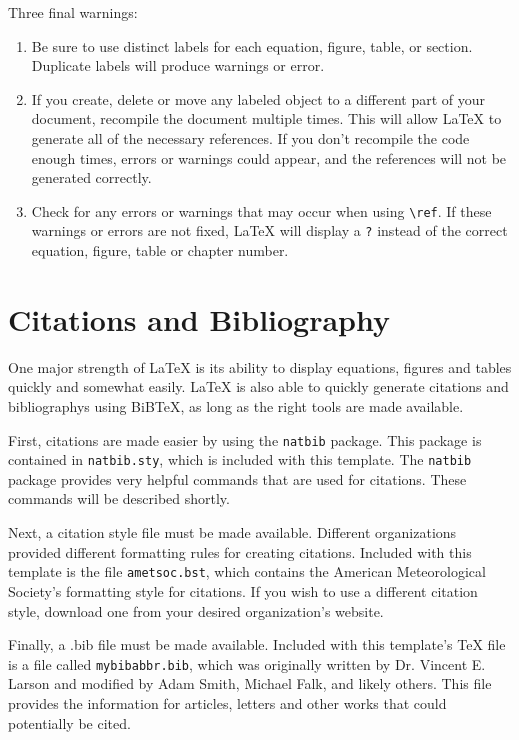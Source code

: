 \documentclass[master]{UWMThesis}
\begin{document}
Three final warnings:

\begin{enumerate}
\item Be sure to use distinct labels for each equation, figure, table, or section.  Duplicate labels will produce warnings or error.

\item If you create, delete or move any labeled object to a different part of your document, recompile the document multiple times.  This will allow LaTeX to generate all of the necessary references.  If you don't recompile the code enough times, errors or warnings could appear, and the references will not be generated correctly.

\item Check for any errors or warnings that may occur when using \verb=\ref=.  If these warnings or errors are not fixed, LaTeX will display a \verb=?= instead of the correct equation, figure, table or chapter number.

\end{enumerate}


\chapter{Citations and Bibliography}
One major strength of LaTeX is its ability to display equations, figures and tables quickly and somewhat easily.  LaTeX is also able to quickly generate citations and bibliographys using BiBTeX, as long as the right tools are made available.

First, citations are made easier by using the \verb=natbib= package.  This package is contained in \verb=natbib.sty=, which is included with this template.  The \verb=natbib= package provides very helpful commands that are used for citations.  These commands will be described shortly.

Next, a citation style file must be made available.  Different organizations provided different formatting rules for creating citations.  Included with this template is the file \verb=ametsoc.bst=, which contains the American Meteorological Society's formatting style for citations.  If you wish to use a different citation style, download one from your desired organization's website.

Finally, a .bib file must be made available.  Included with this template's TeX file is a file called \verb=mybibabbr.bib=, which was originally written by Dr. Vincent E. Larson and modified by Adam Smith, Michael Falk, and likely others.  This file provides the information for articles, letters and other works that could potentially be cited.
\end{document}
